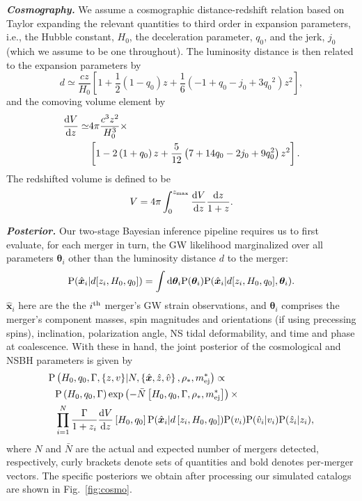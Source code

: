 \documentclass[%
 reprint,
 superscriptaddress,
 nofootinbib,
 amsmath,amssymb,
 aps,
]{revtex4-2}
\newcommand{\hubble}{\ensuremath{H_0}}
\newcommand{\decel}{\ensuremath{q_0}}
\newcommand{\jerk}{\ensuremath{j_0}}
\newcommand{\zmax}{\ensuremath{z_{\rm max}}}
\newcommand{\prob}{\ensuremath{{\rm P}}}
\newcommand{\nexp}{\bar{N}}
\newcommand{\snrmin}{\rho_*}
\newcommand{\mejmin}{m_{\rm ej}^*}
\newcommand{\dgw}{\hat{\bm{x}}}
\begin{document}
\textbf{\emph{Cosmography.}} We assume a cosmographic distance-redshift relation based on Taylor expanding the relevant quantities to third order in expansion parameters, i.e., the Hubble constant, \hubble, the deceleration parameter, \decel, and the jerk, $j_0$ (which we assume to be one throughout). The luminosity distance is then related to the expansion parameters by~\cite{Visser:2004}
\begin{equation}
d \simeq \frac{cz}{\hubble} \left[1 + \frac{1}{2} \left(1 - \decel \right) z + \frac{1}{6} \left(-1 + \decel - \jerk + 3 \decel^2 \right) z^2 \right],
\label{eq:distance}
\end{equation}
and the comoving volume element by
\begin{align}
\frac{{\rm d}V}{{\rm d}z} \simeq & 4\pi \frac{c^3 z^2}{\hubble^3} \times \label{eq:volel} \\
& \left[1 - 2 \left(1 + \decel \right) z + \frac{5}{12} \left(7 + 14 \decel - 2 \jerk + 9 \decel^2 \right) z^2 \right]. \nonumber
\end{align}
The redshifted volume is defined to be 
\begin{equation}
V = 4\pi \int_0^{\zmax} \frac{{\rm d}V}{{\rm d}z} \frac{{\rm d}z}{1+z}.
\label{eq:volume}
\end{equation}

\textbf{\emph{Posterior.}} Our two-stage Bayesian inference pipeline requires us to first evaluate, for each merger in turn, the GW likelihood marginalized over all parameters $\boldsymbol{\theta}_i$ other than the luminosity distance $d$ to the merger:
\begin{equation}
\prob(\dgw_i | d[ z_i, \hubble, \decel ]) = \int {\rm d}\boldsymbol{\theta}_i \prob(\boldsymbol{\theta}_i) \prob(\dgw_i | d[ z_i, \hubble, \decel ], \boldsymbol{\theta}_i).
\label{eq:marge_like}
\end{equation}
$\dgw_i$ here are the the $i^{\rm th}$ merger's GW strain observations, and $\boldsymbol{\theta}_i$ comprises the merger's component masses, spin magnitudes and orientations (if using precessing spins), inclination, polarization angle, NS tidal deformability, and time and phase at coalescence. With these in hand, the joint posterior of the cosmological and NSBH parameters is given by
\begin{align}
\prob & \left( \hubble, \decel, \Gamma, \{z, v\} | N, \left\{ \dgw, \hat{z}, \hat{v} \right\}, \snrmin, \mejmin \right) \propto \label{eq:posterior} \\
& \prob \left( \hubble, \decel, \Gamma \right) \exp \left( -\bar{N} \left[ \hubble, \decel, \Gamma, \snrmin, \mejmin \right] \right) \times \nonumber \\
& \prod_{i = 1}^{N} \frac{\Gamma}{1 + z_i} \frac{{\rm d}V}{{\rm d}z} \left[ \hubble, \decel \right] \prob (\dgw_i | d \left[ z_i, \hubble, \decel \right]) \prob(v_i) \prob(\hat{v}_i | v_i) \prob(\hat{z}_i | z_i), \nonumber
\end{align}
where $N$ and $\nexp$ are the actual and expected number of mergers detected, respectively, curly brackets denote sets of quantities and bold denotes per-merger vectors. The specific posteriors we obtain after processing our simulated catalogs are shown in Fig.~\ref{fig:cosmo}.
\end{document}
